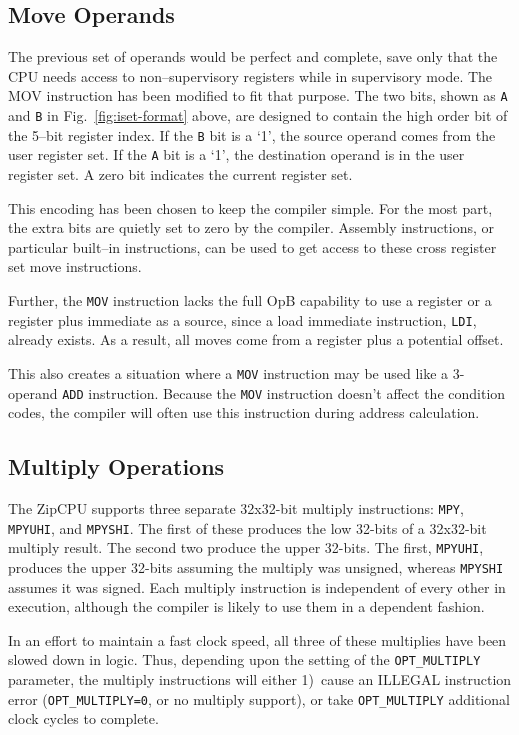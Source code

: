 \documentclass{gqtekspec}
\begin{document}
\subsection{Move Operands}\label{sec:isa-mov}
The previous set of operands would be perfect and complete, save only that the
CPU needs access to non--supervisory registers while in supervisory mode.  The
MOV instruction has been modified to fit that purpose.  The two bits,
shown as {\tt A} and {\tt B} in Fig.~\ref{fig:iset-format} above, are designed
to contain the high order bit of the 5--bit register index.  If the {\tt B}
bit is a `1', the source operand comes from the user register set.  If the
{\tt A} bit is a `1', the destination operand is in the user register set.  A
zero bit indicates the current register set.

This encoding has been chosen to keep the compiler simple.  For the most part,
the extra bits are quietly set to zero by the compiler.  Assembly instructions,
or particular built--in instructions, can be used to get access to these
cross register set move instructions.

Further, the {\tt MOV} instruction lacks the full OpB capability to use a
register or a register plus immediate as a source, since a load immediate
instruction, {\tt LDI}, already exists.  As a result, all moves come from a
register plus a potential offset.

This also creates a situation where a {\tt MOV} instruction may be used
like a 3-operand {\tt ADD} instruction.  Because the {\tt MOV} instruction
doesn't affect the condition codes, the compiler will often use this
instruction during address calculation.
\subsection{Multiply Operations}\label{sec:isa-mpy}
The ZipCPU supports three separate 32x32-bit multiply
instructions: {\tt MPY}, {\tt MPYUHI}, and {\tt MPYSHI}.  The first of these
produces the low 32-bits of a 32x32-bit multiply result.  The second two
produce the upper 32-bits.  The first, {\tt MPYUHI}, produces the upper 32-bits
assuming the multiply was unsigned, whereas {\tt MPYSHI} assumes it was signed.
Each multiply instruction is independent of every other in execution, although
the compiler is likely to use them in a dependent fashion.

In an effort to maintain a fast clock speed, all three of these multiplies
have been slowed down in logic.  Thus, depending upon the setting of
the {\tt OPT\_MULTIPLY} parameter, the multiply instructions
will either 1)~cause an ILLEGAL instruction error ({\tt OPT\_MULTIPLY=0}, or
no multiply support), or take {\tt OPT\_MULTIPLY} additional clock
cycles to complete.
\end{document}

